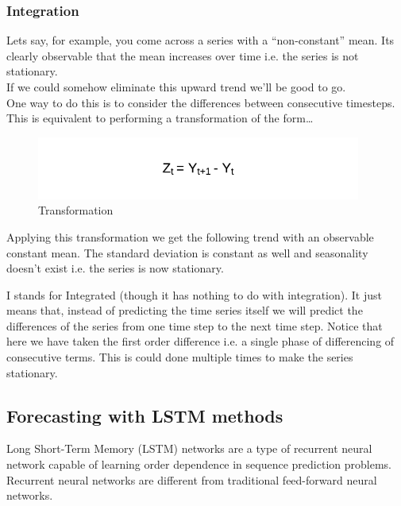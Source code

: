 \documentclass[12pt]{report}
\begin{document}
\subsubsection{Integration}
Lets say, for example, you come across a series with a “non-constant” mean. Its clearly observable that the mean increases over time i.e. the series is not stationary.\\

If we could somehow eliminate this upward trend we’ll be good to go.\\
One way to do this is to consider the differences between consecutive timesteps. This is equivalent to performing a transformation of the form…


\begin{figure}[H]%
  \begin {center}
  \includegraphics[width=0.95\textwidth]{images/Transf.png}
  \caption{Transformation}
  \label{fig:ecg}
  \end {center}
\end{figure}

Applying this transformation we get the following trend with an observable constant mean. The standard deviation is constant as well and seasonality doesn’t exist i.e. the series is now stationary.

I stands for Integrated (though it has nothing to do with integration). It just means that, instead of predicting the time series itself we will predict the differences of the series from one time step to the next time step.
Notice that here we have taken the first order difference i.e. a single phase of differencing of consecutive terms. This is could done multiple times to make the series stationary.\cite{15}


\subsection{Forecasting with LSTM methods}
Long Short-Term Memory (LSTM) networks are a type of recurrent neural network capable of learning order dependence in sequence prediction problems.\\
Recurrent neural networks are different from traditional feed-forward neural networks.
\end{document}
